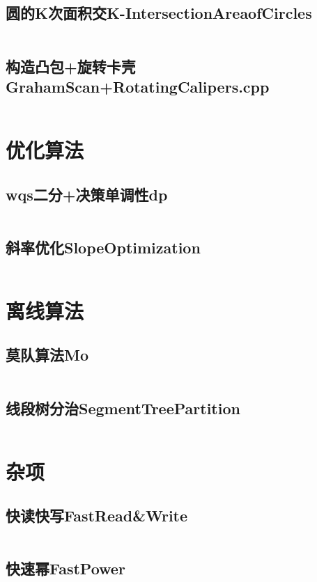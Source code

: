 \documentclass[10pt,a4paper,twoside]{ctexbook}
\renewcommand{\_}{\textscale{1}{\textunderscore}} %
\begin{document}
\subsection{圆的K次面积交K-Intersection\_Area\_of\_Circles}
\inputminted{c++}{../Cpp/计算几何/圆的K次面积交K-Intersection_Area_of_Circles.cpp}
\subsection{构造凸包+旋转卡壳Graham\_Scan+Rotating\_Calipers.cpp}
\inputminted{c++}{../Cpp/计算几何/构造凸包+旋转卡壳Graham_Scan+Rotating_Calipers.cpp}

\newpage
\section{优化算法}
\subsection{wqs二分+决策单调性dp}
\inputminted{c++}{../Cpp/优化算法/wqs二分+决策单调性dp.cpp}
\subsection{斜率优化Slope\_Optimization}
\inputminted{c++}{../Cpp/优化算法/斜率优化Slope_Optimization.cpp}

\newpage
\section{离线算法}
\subsection{莫队算法Mo}
\inputminted{c++}{../Cpp/离线算法/莫队算法Mo.cpp}
\subsection{线段树分治Segment\_Tree\_Partition}
\inputminted{c++}{../Cpp/离线算法/线段树分治Segment_Tree_Partition.cpp}

\newpage
\section{杂项}
\subsection{快读快写Fast\_Read\&Write}
\inputminted{c++}{../Cpp/杂项/快读快写Fast_Read\&Write.cpp}
\subsection{快速幂Fast\_Power}
\inputminted{c++}{../Cpp/杂项/快速幂Fast_Power.cpp}
\end{document}
